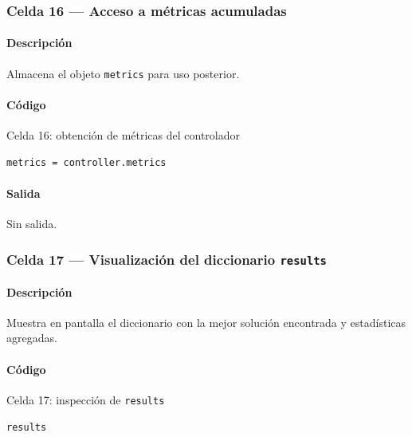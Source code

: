 \subsubsection*{Celda 16 — Acceso a métricas acumuladas}
\paragraph{Descripción} Almacena el objeto \texttt{metrics} para uso posterior.
\paragraph{Código}
\begin{listing}[H]
\caption{Celda 16: obtención de métricas del controlador}
\begin{adjustbox}{max width=\textwidth}
\begin{minipage}{\textwidth}
\begin{verbatim}
metrics = controller.metrics
\end{verbatim}
\end{minipage}
\end{adjustbox}
\end{listing}
\paragraph{Salida} Sin salida.

\subsubsection*{Celda 17 — Visualización del diccionario \texttt{results}}
\paragraph{Descripción} Muestra en pantalla el diccionario con la mejor solución encontrada y estadísticas agregadas.
\paragraph{Código}
\begin{listing}[H]
\caption{Celda 17: inspección de \texttt{results}}
\begin{adjustbox}{max width=\textwidth}
\begin{minipage}{\textwidth}
\begin{verbatim}
results
\end{verbatim}
\end{minipage}
\end{adjustbox}
\end{listing}
